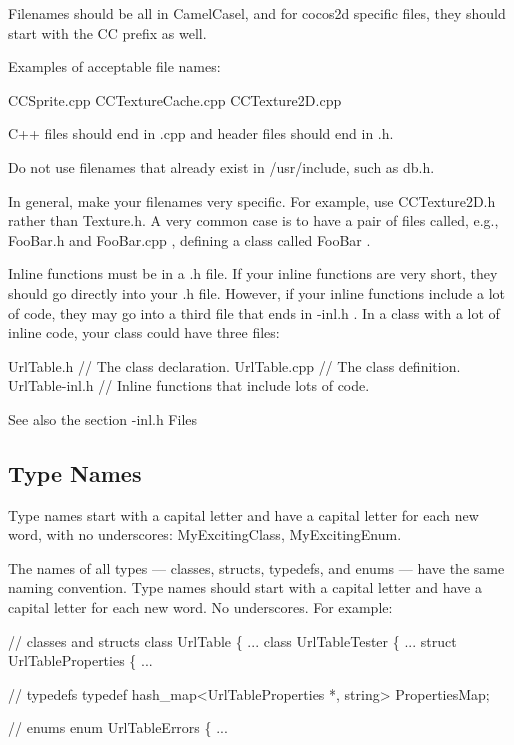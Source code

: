 Filenames should be all in Camel\+Casel, and for cocos2d specific files, they should start with the {\ttfamily CC} prefix as well.

Examples of acceptable file names\+:

\begin{DoxyVerb}CCSprite.cpp
CCTextureCache.cpp
CCTexture2D.cpp
\end{DoxyVerb}


C++ files should end in {\ttfamily .cpp} and header files should end in {\ttfamily .h}.

Do not use filenames that already exist in /usr/include, such as db.\+h.

In general, make your filenames very specific. For example, use {\ttfamily C\+C\+Texture2\+D.\+h} rather than {\ttfamily Texture.\+h}. A very common case is to have a pair of files called, e.\+g., {\ttfamily Foo\+Bar.\+h} and {\ttfamily Foo\+Bar.\+cpp} , defining a class called {\ttfamily Foo\+Bar} .

Inline functions must be in a {\ttfamily .h} file. If your inline functions are very short, they should go directly into your .h file. However, if your inline functions include a lot of code, they may go into a third file that ends in {\ttfamily -\/inl.\+h} . In a class with a lot of inline code, your class could have three files\+:


\begin{DoxyCode}
UrlTable.h       \textcolor{comment}{// The class declaration.}
UrlTable.cpp     \textcolor{comment}{// The class definition.}
UrlTable-inl.h   \textcolor{comment}{// Inline functions that include lots of code.}
\end{DoxyCode}


See also the section -\/inl.\+h Files

\subsection*{Type Names}

Type names start with a capital letter and have a capital letter for each new word, with no underscores\+: {\ttfamily My\+Exciting\+Class}, {\ttfamily My\+Exciting\+Enum}.

The names of all types — classes, structs, typedefs, and enums — have the same naming convention. Type names should start with a capital letter and have a capital letter for each new word. No underscores. For example\+:


\begin{DoxyCode}
\textcolor{comment}{// classes and structs}
\textcolor{keyword}{class }UrlTable \{ ...
class UrlTableTester \{ ...
struct UrlTableProperties \{ ...

\textcolor{comment}{// typedefs}
typedef hash\_map<UrlTableProperties *, string> PropertiesMap;

\textcolor{comment}{// enums}
\textcolor{keyword}{enum} UrlTableErrors \{ ...
\end{DoxyCode}


